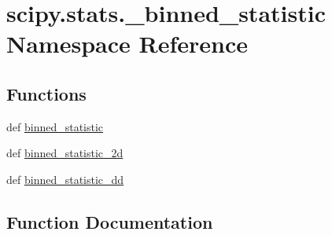 \hypertarget{namespacescipy_1_1stats_1_1__binned__statistic}{}\section{scipy.\+stats.\+\_\+binned\+\_\+statistic Namespace Reference}
\label{namespacescipy_1_1stats_1_1__binned__statistic}
\subsection*{Functions}
\begin{DoxyCompactItemize}
\item 
def \hyperlink{namespacescipy_1_1stats_1_1__binned__statistic_aea05b3c6669a95e82ca5d9b72ab7b882}{binned\+\_\+statistic}
\item 
def \hyperlink{namespacescipy_1_1stats_1_1__binned__statistic_aa6e4a8ca8657a2ca112d234343e53e41}{binned\+\_\+statistic\+\_\+2d}
\item 
def \hyperlink{namespacescipy_1_1stats_1_1__binned__statistic_a941daaf9b5418382b138514fd49ca732}{binned\+\_\+statistic\+\_\+dd}
\end{DoxyCompactItemize}


\subsection{Function Documentation}
\hypertarget{namespacescipy_1_1stats_1_1__binned__statistic_aea05b3c6669a95e82ca5d9b72ab7b882}{}
